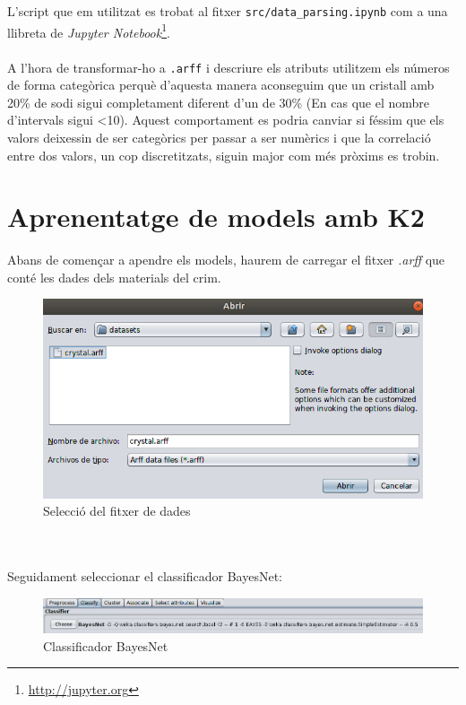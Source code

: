 \documentclass[11pt,a4paper]{article}
\begin{document}
L'script que em utilitzat es trobat al fitxer \texttt{src/data\_parsing.ipynb} com a una llibreta de \textit{Jupyter Notebook}\footnote{\url{http://jupyter.org}}.
\\\\
A l'hora de transformar-ho a \texttt{.arff} i descriure els atributs utilitzem els números de forma categòrica perquè d'aquesta manera aconseguim que un cristall amb 20\% de sodi sigui completament diferent d'un de 30\% (En cas que el nombre d'intervals sigui <10). Aquest comportament es podria canviar si féssim que els valors deixessin de ser categòrics per passar a ser numèrics i que la correlació entre dos valors, un cop discretitzats, siguin major com més pròxims es trobin.

\newpage

\part{Aprenentatge de models amb K2}
Abans de començar a apendre els models, haurem de carregar el fitxer \textit{.arff} que conté les dades dels materials del crim.\\
\begin{figure}[hbtp]
\centering
\includegraphics[scale=0.4]{Figures/1.png}
\caption{Selecció del fitxer de dades }
\end{figure}
\\\\
Seguidament seleccionar el classificador BayesNet:\\
\begin{figure}[hbtp]
\centering
\includegraphics[scale=0.5]{Figures/2.png}
\caption{Classificador BayesNet}
\end{figure}
\end{document}
